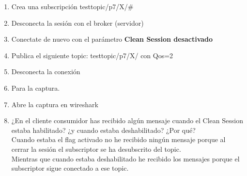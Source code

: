 \documentclass[12pt, a4paper]{report}
\begin{document}
\begin{enumerate}
	\item Crea una subscripción testtopic/p7/X/\#
	\item Desconecta la sesión con el broker (servidor)
	\item Conectate de nuevo con el parámetro \textbf{Clean Session desactivado}
	\item Publica el siguiente topic: testtopic/p7/X/ con Qos=2
	\item Desconecta la conexión
	\item Para la captura.
	\item Abre la captura en wireshark
	\item ¿En el cliente consumidor has recibido algún mensaje cuando el Clean Session estaba habilitado?
	¿y cuando estaba deshabilitado? ¿Por qué?\\
	
	Cuando estaba el flag activado no he recibido ningún mensaje porque al cerrar la sesión el subscriptor se ha desubscrito del topic.\\
	Mientras que cuando estaba deshabilitado he recibido los mensajes porque el subscriptor sigue conectado a ese topic.
\end{enumerate}
\end{document}

